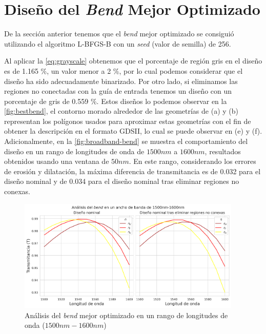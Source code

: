 \section{Diseño del \emph{Bend} Mejor Optimizado}\label{sec:best-bend}

De la sección anterior tenemos que el \emph{bend} mejor optimizado se consiguió
utilizando el algoritmo L-BFGS-B con un \emph{seed} (valor de semilla) de 256.

Al aplicar la \autoref{eq:grayscale} obtenemos que el porcentaje de región gris en el diseño
es de 1.165 \%, un valor menor a 2 \%, por lo cual podemos considerar que el diseño ha sido
adecuadamente binarizado. 
Por otro lado, si eliminamos las regiones no conectadas con la guía de entrada
tenemos un diseño con un porcentaje de gris de 0.559 \%.
Estos diseños lo podemos observar en la \autoref{fig:bestbend}, 
el contorno morado alrededor de las geometrías de (a) y (b) representan los polígonos
usados para aproximar estas geometrías con el fin de obtener la descripción en el formato
GDSII, lo cual se puede observar en (e) y (f).
Adicionalmente, en la \autoref{fig:broadband-bend} se muestra el comportamiento del diseño
en un rango de longitudes de onda de $1500nm$ a $1600 nm$, resultados obtenidos usando una ventana de $50nm$.
En este rango, considerando los errores de erosión y dilatación, 
la máxima diferencia de transmitancia es de 0.032 para el diseño nominal
y de 0.034 para el diseño nominal tras eliminar regiones no conexas.

\begin{figure}[H]
  \centering
  \includegraphics[width=0.95\textwidth]{image/results/bend/best/broadband-bend.png}
  \caption{Análisis del \emph{bend} mejor optimizado en un rango de longitudes de onda ($1500 nm-1600 nm$)}
  \label{fig:broadband-bend}
\end{figure}



